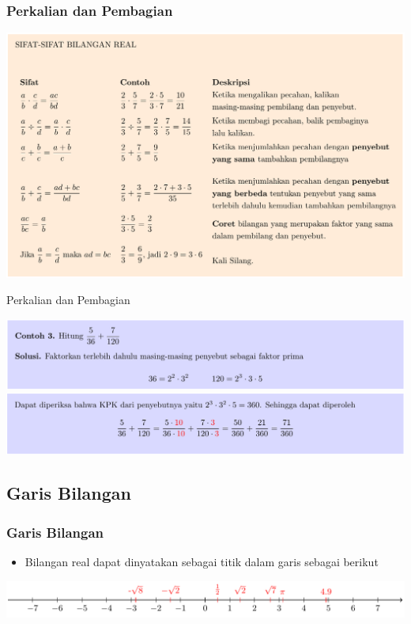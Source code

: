 \documentclass[pdflatex,compress,mathserif]{beamer}
\begin{document}
\begin{frame}
	\frametitle{Perkalian dan Pembagian}
	\begin{center}
		\includegraphics[width=\linewidth]{img/img09}
	\end{center}
\end{frame}

\begin{frame}{Perkalian dan Pembagian}
	\begin{center}
		\includegraphics[width=\linewidth]{img/img10}
		\includegraphics[width=\linewidth]{img/img11}
	\end{center}
\end{frame}

\subsection{Garis Bilangan}

\begin{frame}
	\frametitle{Garis Bilangan}
	\begin{itemize}
		\item Bilangan real dapat dinyatakan sebagai titik dalam garis sebagai berikut
	\end{itemize}
	\begin{center}
		\includegraphics[width=\linewidth]{img/img12}
	\end{center}
\end{frame}
\end{document}
